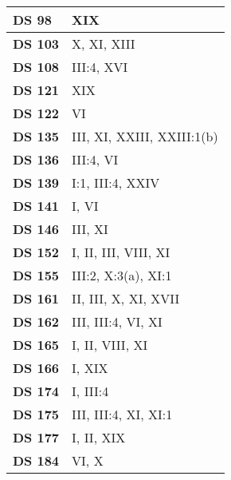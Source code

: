 \begin{xltabular}{\linewidth}{ l | X }
    \textbf {DS 98} & XIX \\ \hline 
    
    \textbf {DS 103} & X, XI, XIII \\ \hline 
    
    \textbf {DS 108} & III:4, XVI \\ \hline 
    
    \textbf {DS 121} & XIX \\ \hline 
    
    \textbf {DS 122} & VI \\ \hline 
    
    \textbf {DS 135} & III, XI, XXIII, XXIII:1(b) \\ \hline 
    
    \textbf {DS 136} & III:4, VI \\ \hline 
    
    \textbf {DS 139} & I:1, III:4, XXIV \\ \hline 
    
    \textbf {DS 141} & I, VI \\ \hline 
    
    \textbf {DS 146} & III, XI \\ \hline 
    
    \textbf {DS 152} & I, II, III, VIII, XI \\ \hline 
    
    \textbf {DS 155} & III:2, X:3(a), XI:1 \\ \hline 
    
    \textbf {DS 161} & II, III, X, XI, XVII \\ \hline 
    
    \textbf {DS 162} & III, III:4, VI, XI \\ \hline 
    
    \textbf {DS 165} & I, II, VIII, XI \\ \hline 
    
    \textbf {DS 166} & I, XIX \\ \hline 
    
    \textbf {DS 174} & I, III:4 \\ \hline 
    
    \textbf {DS 175} & III, III:4, XI, XI:1 \\ \hline 
    
    \textbf {DS 177} & I, II, XIX \\ \hline 
    
    \textbf {DS 184} & VI, X \\ \hline 
    

\end{xltabular}
